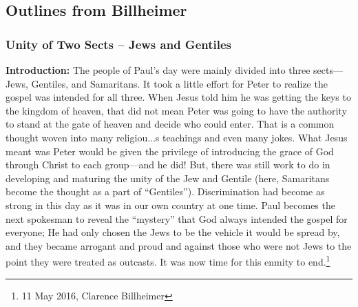 \subsection{Outlines from Billheimer}

\subsubsection{Unity of Two Sects -- Jews and Gentiles}
\textbf{Introduction:} The people of Paul’s day were mainly divided into three sects—Jews, Gentiles, and Samaritans. It took a little effort for Peter to realize the gospel was intended for all three. When Jesus told him he was getting the keys to the kingdom of heaven, that did not mean Peter was going to have the authority to stand at the gate of heaven and decide who could enter. That is a common thought woven into many religiou...s teachings and even many jokes. What Jesus meant was Peter would be given the privilege of introducing the grace of God through Christ to each group—and he did!
But, there was still work to do in developing and maturing the unity of the Jew and Gentile (here, Samaritans become the thought as a part of “Gentiles”). Discrimination had become as strong in this day as it was in our own country at one time. Paul becomes the next spokesman to reveal the “mystery” that God always intended the gospel for everyone; He had only chosen the Jews to be the vehicle it would be spread by, and they became arrogant and proud and against those who were not Jews to the point they were treated as outcasts. It was now time for this enmity to end.\footnote{11 May 2016, Clarence Billheimer}
